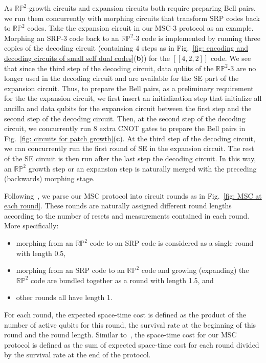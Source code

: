 \documentclass[reprint,aps,twocolumn,superscriptaddress,showpacs,notitlepage,10pt]{revtex4-2}
\theoremstyle{definition}
\begin{document}
As $\mathbb{RP}^2$-growth circuits and expansion circuits both require preparing Bell pairs, we run them concurrently with morphing circuits that transform SRP codes back to $\mathbb{RP}^2$ codes. Take the expansion circuit in our MSC-3 protocol as an example. Morphing an SRP-3 code back to an $\mathbb{RP}^2$-3 code is implemented by running three copies of the decoding circuit (containing $4$ steps as in Fig.~\ref{fig: encoding and decoding circuits of small self dual codes}(\textbf{b})) for the $[[4,2,2]]$ code.   We see that since the third step of the decoding circuit, data qubits of the $\mathbb{RP}^2$-3 are no longer used in the decoding circuit and are available for the SE part of the expansion circuit. Thus, to prepare the Bell pairs, as a preliminary requirement for the the expansion circuit, we first insert an initialization step that initialize all ancilla and data qubits for the expansion circuit between the first step and the second step of the decoding circuit. Then, at the second step of the decoding circuit, we concurrently run 8 extra CNOT gates to prepare the Bell pairs in Fig.~\ref{fig: circuits for patch growth}(\textbf{c}). At the third step of the decoding circuit, we can concurrently run the first round of SE in the expansion circuit. The rest of the SE circuit is then run after the last step the decoding circuit. In this way, an $\mathbb{RP}^2$ growth step or an expansion step is naturally merged with the preceding (backwards) morphing stage. 

Following~\cite{gidney_magic_2024}, we parse our MSC protocol into circuit rounds as in Fig.~\ref{fig: MSC at each round}. These rounds are naturally assigned different round lengths according to the number of resets and measurements contained in each round. More specifically:
\begin{itemize}
\item morphing from an $\mathbb{RP}^2$ code to an SRP code is considered as a single round with length 0.5,
\item  morphing from an SRP code to an $\mathbb{RP}^2$ code and growing (expanding) the $\mathbb{RP}^2$ code are bundled together as a round with length 1.5, and
\item  other rounds all have length 1.
\end{itemize}
 For each round, the expected space-time cost is defined as the product of the number of active qubits for this round, the survival rate at the beginning of this round and the round length. Similar to~\cite{gidney_magic_2024}, the space-time cost for our MSC protocol is defined as the sum of expected space-time cost for each round divided by the survival rate at the end of the protocol. 




\end{document}
